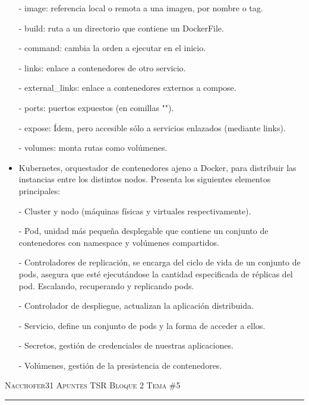 \documentclass[12pt]{amsart}
\begin{document}
\begin{itemize}
    \subitem - image: referencia local o remota a una imagen, por nombre o tag.
    
    \subitem - build: ruta a un directorio que contiene un DockerFile.
    
    \subitem - command: cambia la orden a ejecutar en el inicio.
    
    \subitem - links: enlace a contenedores de otro servicio.
    
    \subitem - external\_links: enlace a contenedores externos a compose.
    
    \subitem - ports: puertos expuestos (en comillas "").
    
    \subitem - expose: Ídem, pero accesible sólo a servicios enlazados (mediante links).
    
    \subitem - volumes: monta rutas como volúmenes.
    
    \item Kubernetes, orquestador de contenedores ajeno a Docker, para distribuir las instancias entre los distintos nodos. Presenta los siguientes elementos principales:
    
    \subitem - Cluster y nodo (máquinas físicas y virtuales respectivamente).
    
    \subitem - Pod, unidad más pequeña desplegable que contiene un conjunto de contenedores con namespace y volúmenes compartidos.
    
    \subitem - Controladores de replicación, se encarga del ciclo de vida de un conjunto de pods, asegura que esté ejecutándose la cantidad especificada de réplicas del pod. Escalando, recuperando y replicando pods.
    
    \subitem - Controlador de despliegue, actualizan la aplicación distribuida.
    
    \subitem - Servicio, define un conjunto de pods y la forma de acceder a ellos.
    
    \subitem - Secretos, gestión de credenciales de nuestras aplicaciones.
    
    \subitem - Volúmenes, gestión de la presistencia de contenedores.
    
    \end{itemize}
    
    
    \pagebreak
    
    {\scshape Nacchofer31} \hfill {\scshape \large Apuntes TSR Bloque 2} \hfill {\scshape Tema \#5}
    
    \hrule
    
    \medskip
    
\end{document}

